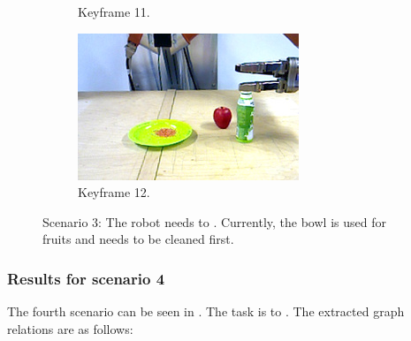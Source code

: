 \begin{figure}
\begin{subfigure}[t]{0.475\textwidth}
    \caption{Keyframe 11.}
    \label{fig:sec_usingaffordanceforplanning_results_scenario3_11}
  \end{subfigure}
  \hfill
  \begin{subfigure}[t]{0.475\textwidth}
    \includegraphics[width=\textwidth]{./figures/sec/planning/exec3/frame3253.jpg}
    \caption{Keyframe 12.}
    \label{fig:sec_usingaffordanceforplanning_results_scenario3_12}
  \end{subfigure}
  \caption{Scenario 3: The robot needs to . Currently, the bowl is used for fruits and needs to be cleaned first.}
  \label{fig:sec_usingaffordanceforplanning_results_scenario3}
\end{figure}





\subsubsection{Results for scenario 4}
\label{sssec:action_results_usingaffordanceforplanning_resultsforscenario4}

The fourth scenario can be seen in . 
The task is to . 
The extracted graph relations are as follows:

